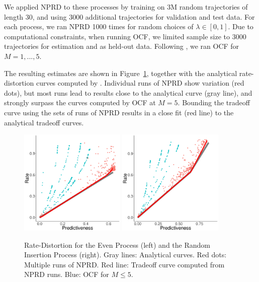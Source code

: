 \documentclass[entropy,article,submit,moreauthors,pdftex,10pt,a4paper]{Definitions/mdpi}
\begin{document}
We applied NPRD to these processes by training on 3M random trajectories of length 30, and using 3000 additional trajectories for validation and test data.
For each process, we ran NPRD 1000 times for random choices of $\lambda \in [0,1]$.
Due to computational constraints, when running OCF, we limited sample size to 3000 trajectories for estimation and as held-out data.
Following \citet{marzen-predictive-2016}, we ran OCF for $M=1,...,5$.

The resulting estimates are shown in Figure~\ref{fig:even}, together with the analytical rate-distortion curves computed by \citet{marzen-predictive-2016}.
Individual runs of NPRD show variation (red dots), but most runs lead to results close to the analytical curve (gray line), and strongly surpass the curves computed by OCF at $M=5$.
Bounding the tradeoff curve using the sets of runs of NPRD results in a close fit (red line) to the analytical tradeoff curves.

\begin{figure}
\centering
\includegraphics[width=0.45\textwidth]{code/figures/even-info.pdf}
\includegraphics[width=0.45\textwidth]{code/figures/rip-info.pdf}

	\caption{Rate-Distortion for the Even Process (left) and the Random Insertion Process (right). Gray lines: Analytical curves. Red dots: Multiple runs of NPRD. Red line: Tradeoff curve computed from NPRD runs. Blue: OCF for $M\leq 5$. }\label{fig:even}
\end{figure}
\end{document}
